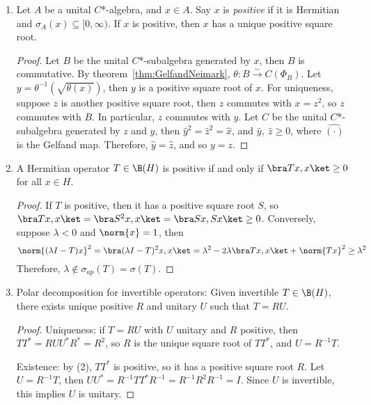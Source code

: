 \documentclass[a4paper]{article}
\begin{document}
\begin{eg}
	\begin{enumerate}[label=(\arabic*)]
		\item Let $A$ be a unital $C$*-algebra, and $x\in A$. Say $x$ is \emph{positive} if it is Hermitian and $\sigma_A(x)\subseteq [0,\infty)$. If $x$ is positive, then $x$ has a unique positive square root.
		\vspace{-\topsep}
		\begin{proof}
		 Let $B$ be the unital $C$*-subalgebra generated by $x$, then $B$ is commutative. By theorem~\ref{thm:GelfandNeimark}, $\theta:B\xrightarrow{\sim}C(\Phi_B)$. Let $y=\theta^{-1}(\sqrt{\theta(x)})$, then $y$ is a positive square root of $x$. For uniqueness, suppose $z$ is another positive square root, then $z$ commutes with $x=z^2$, so $z$ commutes with $B$. In particular, $z$ commutes with $y$. Let $C$ be the unital $C$*-subalgebra generated by $z$ and $y$, then $\hat{y}^2=\hat{z}^2=\hat{x}$, and $\hat{y},\ \hat{z}\geq 0$, where $\hat{(\cdot)}$ is the Gelfand map. Therefore, $\hat{y}=\hat{z}$, and so $y=z$.
		\end{proof}
		\item A Hermitian operator $T\in\B(H)$ is positive if and only if $\bra Tx, x\ket\geq 0$ for all $x\in H$.
		\vspace{-\topsep}
		\begin{proof}
  		If $T$ is positive, then it has a positive square root $S$, so $\bra Tx,x\ket=\bra S^2x,x\ket=\bra Sx,Sx\ket\geq 0$. Conversely, suppose $\lambda<0$ and $\norm{x}=1$, then
		\[\norm{(\lambda I-T)x}^2=\bra(\lambda I-T)^2x,x\ket=\lambda^2-2\lambda\bra Tx,x\ket+\norm{Tx}^2\geq\lambda^2\]
		Therefore, $\lambda\notin\sigma_{ap}(T)=\sigma(T)$.
		\end{proof}
		\item Polar decomposition for invertible operators: Given invertible $T\in\B(H)$, there exists unique positive $R$ and unitary $U$ such that $T=RU$.
		\vspace{-\topsep}
		\begin{proof}
		 Uniqueness: if $T=RU$ with $U$ unitary and $R$ positive, then $TT^*=RUU^*R^*=R^2$, so $R$ is the unique square root of $TT^*$, and $U=R^{-1}T$.

		 Existence: by (2), $TT^*$ is positive, so it has a positive square root $R$. Let $U=R^{-1}T$, then $UU^*=R^{-1}TT^*R^{-1}=R^{-1}R^2R^{-1}=I$. Since $U$ is invertible, this implies $U$ is unitary.
		\end{proof}
	\end{enumerate}
\end{eg}

\printindex
\end{document}
